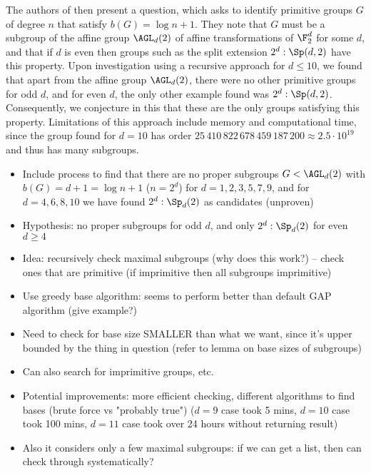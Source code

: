 The authors of \cite{moscatiello_roney-dougal2021} then present a question, which asks to identify primitive groups $G$ of degree $n$ that satisfy $b(G) = \log n + 1$. They note that $G$ must be a subgroup of the affine group $\AGL_d(2)$ of affine transformations of $\F_2^d$ for some $d$, and that if $d$ is even then groups such as the split extension $2^d : \Sp(d,2)$ have this property. Upon investigation using a recursive approach for $d \leq 10$, we found that apart from the affine group $\AGL_d(2)$, there were no other primitive groups for odd $d$, and for even $d$, the only other example found was $2^d : \Sp(d,2)$. Consequently, we conjecture in this \thesis{} that these are the only groups satisfying this property. Limitations of this approach include memory and computational time, since the group found for $d = 10$ has order $25\,410\,822\,678\,459\,187\,200 \approx 2.5 \cdot 10^{19}$ and thus has many subgroups.

\begin{itemize}
    \item Include process to find that there are no proper subgroups $G < \AGL_d(2)$ with $b(G) = d + 1 = \log n + 1$ ($n = 2^d$) for $d = 1,2,3,5,7,9$, and for $d = 4,6,8,10$ we have found $2^d : \Sp_d(2)$ as candidates (unproven)
    \item Hypothesis: no proper subgroups for odd $d$, and only $2^d : \Sp_d(2)$ for even $d \geq 4$
    \item Idea: recursively check maximal subgroups (why does this work?) -- check ones that are primitive (if imprimitive then all subgroups imprimitive)
    \item Use greedy base algorithm: seems to perform better than default GAP algorithm (give example?)
    \item Need to check for base size SMALLER than what we want, since it's upper bounded by the thing in question (refer to lemma on base sizes of subgroups)
    \item Can also search for imprimitive groups, etc.
    \item Potential improvements: more efficient checking, different algorithms to find bases (brute force vs "probably true") ($d = 9$ case took 5 mins, $d = 10$ case took 100 mins, $d = 11$ case took over 24 hours without returning result)
    \item Also it considers only a few maximal subgroups: if we can get a list, then can check through systematically?
\end{itemize}